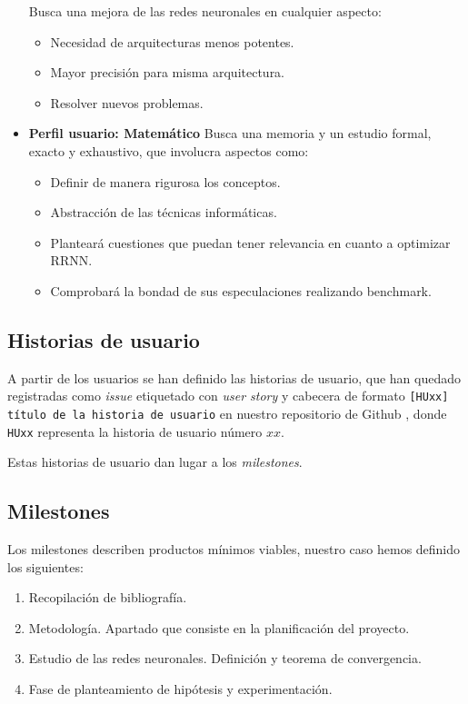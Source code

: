 \begin{itemize}
Busca una mejora de las redes neuronales en cualquier aspecto:

\begin{itemize}
    \item Necesidad de arquitecturas menos potentes.
    \item Mayor precisión para misma arquitectura.
    \item Resolver nuevos problemas.
\end{itemize}

\item \textbf{Perfil usuario: Matemático}
Busca una memoria y un estudio formal, exacto  y exhaustivo, que involucra aspectos como: 
\begin{itemize}
    \item Definir de manera rigurosa los conceptos.
    \item Abstracción de las técnicas informáticas.
    \item Planteará cuestiones que puedan tener relevancia en cuanto a optimizar RRNN.
    \item Comprobará la bondad de sus especulaciones realizando benchmark.
\end{itemize}
\end{itemize}

\subsection{Historias de usuario}  

A partir de los usuarios se han definido las historias de usuario, que han quedado registradas 
como \textit{issue} etiquetado con \textit{user story} y cabecera de formato
\texttt{[HUxx] título de la historia de usuario} en nuestro 
repositorio de Github \cite{TFG-Estudio-de-las-redes-neuronales},
 donde \texttt{HUxx} representa
la historia de usuario número $xx$.     

Estas historias de usuario dan lugar a los \textit{milestones}. 

\subsection{Milestones}  

Los milestones describen productos mínimos viables, nuestro caso hemos definido los siguientes: 

\begin{enumerate}
    \item Recopilación de bibliografía. 
    \item Metodología. Apartado que consiste en la planificación del proyecto. 
    \item Estudio de las redes neuronales. Definición y teorema de convergencia. 
    \item Fase de planteamiento de hipótesis y experimentación. 
\end{enumerate}  


